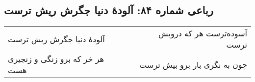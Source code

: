 \begin{center}
\section*{رباعی شماره ۸۴: آلودهٔ دنیا جگرش ریش ترست}
\label{sec:sh084}
\begin{longtable}{l p{0.5cm} r}
آلودهٔ دنیا جگرش ریش ترست
&&
آسوده‌ترست هر که درویش ترست
\\
هر خر که برو زنگی و زنجیری هست
&&
چون به نگری بار برو بیش ترست
\\
\end{longtable}
\end{center}
